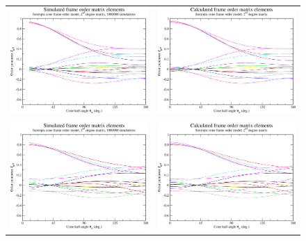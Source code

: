 \begin{figure}
\centering
  \begin{tabular}{@{}cc@{}}
    \includegraphics[width=.5\textwidth]{images/frame_order_matrix/Sijkl_iso_cone_out_of_frame_theta_x_ens1000000.eps} &
    \includegraphics[width=.5\textwidth]{images/frame_order_matrix/Sijkl_iso_cone_out_of_frame_theta_x_calc.eps} \\
    \\[-5pt]
    \includegraphics[width=.5\textwidth]{images/frame_order_matrix/Sijkl_iso_cone_out_of_frame_theta_z_ens1000000.eps} &
    \includegraphics[width=.5\textwidth]{images/frame_order_matrix/Sijkl_iso_cone_out_of_frame_theta_z_calc.eps} \\

\end{tabular}
\end{figure}
